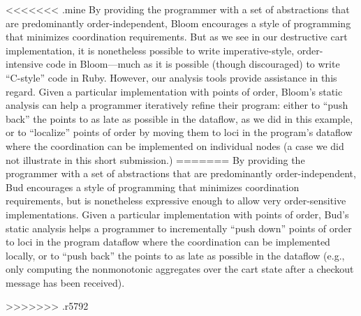 <<<<<<< .mine
By providing the programmer with a set of abstractions that are predominantly 
order-independent, Bloom encourages a style of programming that minimizes  
coordination requirements.  But as we see in our destructive cart implementation, it is nonetheless possible to write imperative-style, order-intensive code in Bloom---much as it is possible (though discouraged) to write ``C-style'' code in Ruby.  However, our analysis tools provide assistance in this regard.
Given a particular implementation with points of order, Bloom's 
static analysis can help a programmer iteratively refine their program: either to ``push back'' the points to as late as possible in the dataflow, as we did in this example, or to ``localize'' points of order by moving them
to loci in the program's dataflow where the coordination can be implemented on individual nodes (a case we did not illustrate in this short submission.)
=======
By providing the programmer with a set of abstractions that are predominantly
order-independent, Bud encourages a style of programming that minimizes
coordination requirements, but is nonetheless expressive enough to allow very
order-sensitive implementations.  Given a particular implementation with points
of order, Bud's static analysis helps a programmer to incrementally ``push
down'' points of order to loci in the program dataflow where the coordination
can be implemented locally, or to ``push back'' the points to as late as
possible in the dataflow (e.g., only computing the nonmonotonic aggregates over
the cart state after a checkout message has been received).


>>>>>>> .r5792
